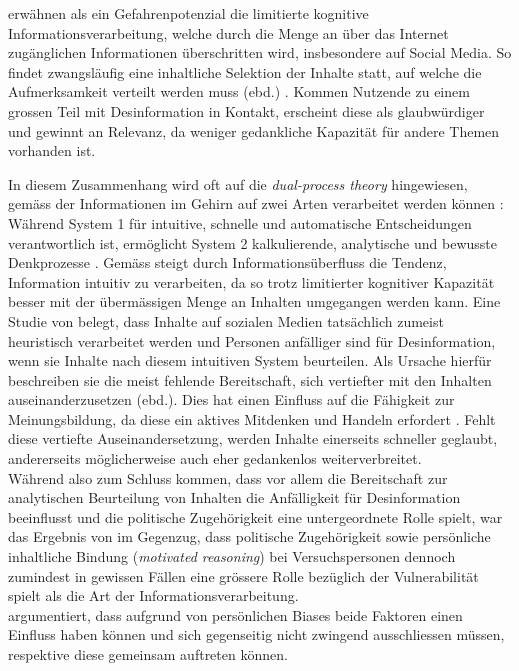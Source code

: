 \documentclass[12pt,a4paper]{article}        %
\begin{document}
\textcite[248]{hohlfeld_schlechte_2020} erwähnen als ein Gefahrenpotenzial die limitierte kognitive Informationsverarbeitung, welche durch die Menge an über das Internet zugänglichen Informationen überschritten wird, insbesondere auf Social Media. So findet zwangsläufig eine inhaltliche Selektion der Inhalte statt, auf welche die Aufmerksamkeit verteilt werden muss (ebd.) \parencite[vgl.\ auch][5]{tandoc_jr_facts_2019}. Kommen Nutzende zu einem grossen Teil mit Desinformation in Kontakt, erscheint diese als glaubwürdiger und gewinnt an Relevanz, da weniger gedankliche Kapazität für andere Themen vorhanden ist.

In diesem Zusammenhang wird oft auf die \textit{dual-process theory} hingewiesen, gemäss der Informationen im Gehirn auf zwei Arten verarbeitet werden können \parencite[40]{pennycook_lazy_2019}: Während System 1 für intuitive, schnelle und automatische Entscheidungen verantwortlich ist, ermöglicht System 2 kalkulierende, analytische und bewusste Denkprozesse \parencite[249]{hohlfeld_schlechte_2020}. Gemäss \textcite[487]{schaewitz_when_2020} steigt durch Informationsüberfluss die Tendenz, Information intuitiv zu verarbeiten, da so trotz limitierter kognitiver Kapazität besser mit der übermässigen Menge an Inhalten umgegangen werden kann.
Eine Studie von \textcite[48]{pennycook_lazy_2019} belegt, dass Inhalte auf sozialen Medien tatsächlich zumeist heuristisch verarbeitet werden und Personen anfälliger sind für Desinformation, wenn sie Inhalte nach diesem intuitiven System beurteilen. Als Ursache hierfür beschreiben sie die meist fehlende Bereitschaft, sich vertiefter mit den Inhalten auseinanderzusetzen (ebd.). Dies hat einen Einfluss auf die Fähigkeit zur Meinungsbildung, da diese ein aktives Mitdenken und Handeln erfordert \parencite[216]{schmidt_meinungsbildung_2022}. Fehlt diese vertiefte Auseinandersetzung, werden Inhalte einerseits schneller geglaubt, andererseits möglicherweise auch eher gedankenlos weiterverbreitet. \\
Während \citeauthor{pennycook_lazy_2019} also zum Schluss kommen, dass vor allem die Bereitschaft zur analytischen Beurteilung von Inhalten die Anfälligkeit für Desinformation beeinflusst und die politische Zugehörigkeit eine untergeordnete Rolle spielt, war das Ergebnis von \textcite[502]{schaewitz_when_2020} im Gegenzug, dass politische Zugehörigkeit sowie persönliche inhaltliche Bindung (\textit{motivated reasoning}) bei Versuchspersonen dennoch zumindest in gewissen Fällen eine grössere Rolle bezüglich der Vulnerabilität spielt als die Art der Informationsverarbeitung. \\
\textcite[24]{zoglauer_konstruierte_2021} argumentiert, dass aufgrund von persönlichen Biases beide Faktoren einen Einfluss haben können und sich gegenseitig nicht zwingend ausschliessen müssen, respektive diese gemeinsam auftreten können. 
\end{document}
